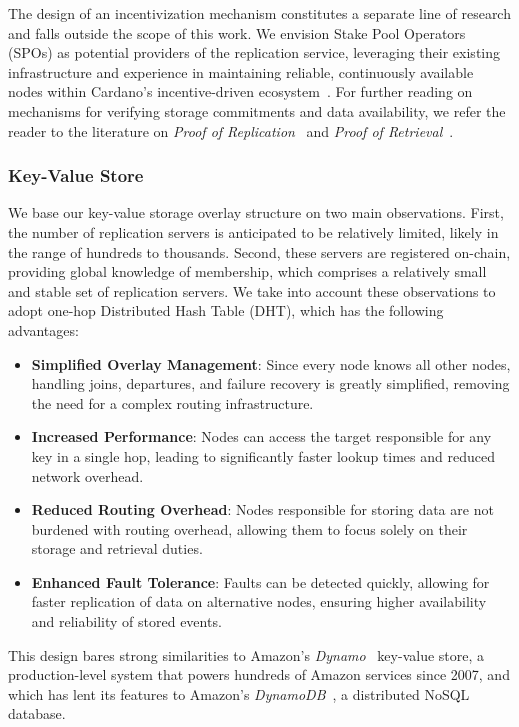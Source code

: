 The design of an incentivization mechanism constitutes a separate line of research and falls outside the scope of this work.
We envision Stake Pool Operators (SPOs) as potential providers of the replication service, leveraging their existing infrastructure and experience in maintaining reliable, continuously available nodes within Cardano's incentive-driven ecosystem~\cite{Cardano-SPOs}.
For further reading on mechanisms for verifying storage commitments and data availability, we refer the reader to the literature on \emph{Proof of Replication}~\cite{PoReplication, PoReplicationScaling} and \emph{Proof of Retrieval}~\cite{PoRTheoryAndPractice, PoRCompact, PoRLargeFiles}.

\subsubsection{Key-Value Store}

We base our key-value storage overlay structure on two main observations.
First, the number of replication servers is anticipated to be relatively limited, likely in the range of hundreds to thousands.
Second, these servers are registered on-chain, providing global knowledge of membership, which comprises a relatively small and stable set of replication servers.
We take into account these observations to adopt one-hop Distributed Hash Table (DHT), which has the following advantages:
\begin{itemize}
  \item \textbf{Simplified Overlay Management}: Since every node knows all other nodes, handling joins, departures, and failure recovery is greatly simplified, removing the need for a complex routing infrastructure.
  \item \textbf{Increased Performance}: Nodes can access the target responsible for any key in a single hop, leading to significantly faster lookup times and reduced network overhead.
  \item \textbf{Reduced Routing Overhead}: Nodes responsible for storing data are not burdened with routing overhead, allowing them to focus solely on their storage and retrieval duties.
  \item \textbf{Enhanced Fault Tolerance}: Faults can be detected quickly, allowing for faster replication of data on alternative nodes, ensuring higher availability and reliability of stored events.
\end{itemize}

This design bares strong similarities to Amazon's \emph{Dynamo}~\cite{Dynamo} key-value store, a production-level system that powers hundreds of Amazon services since 2007, and which has lent its features to Amazon's \emph{DynamoDB}~\cite{DynamoDB}, a distributed NoSQL database.

